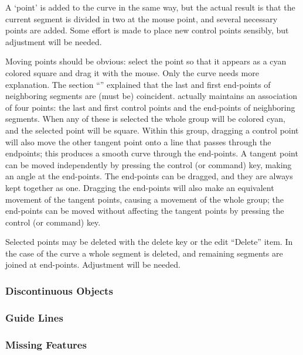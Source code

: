 			A `point' is added to the \IXbezn{} curve in the
			same way, but the actual result is that the current
			segment is divided in two at the mouse point, and
			several necessary points are added. Some effort is
			made to place new  control
			points sensibly, but adjustment will be needed.
			
			Moving points should be obvious: select the point so
			that it appears as a cyan colored square and drag it
			with the mouse. Only the \IXbezn{} curve needs more
			explanation. The section
			``'' explained
			that the last and first end-points of neighboring
			segments are (must be) coincident. \IXpkgu{}
			actually maintains an association of four points:
			the last and first  control points
			and the end-points of neighboring segments. When any
			of these is selected the whole group will be
			colored cyan, and the selected point will be square.
			Within this group, dragging a 
			control point will also move the other tangent
			point onto a line that passes through the endpoints;
			this produces a smooth curve through the end-points.
			A tangent point can be moved independently by
			pressing the control (or command) key, making
			an angle at the end-points. The end-points can
			be dragged, and they are always kept together
			as one. Dragging the end-points will also make
			an equivalent movement of the
			tangent points, causing a movement of the
			whole group; the end-points can be moved
			without affecting the tangent points by
			pressing the control (or command) key.
			
			Selected points may be deleted with the delete key
			or the edit  ``Delete'' item.
			In the case of the
			\IXbezn{} curve a whole segment is
			deleted, and remaining segments are joined at
			end-points. Adjustment will be needed.

			\subsubsection{Discontinuous Objects}%
			\label{sssec:discont_objects}

			\subsubsection{Guide Lines}%
			\label{sssec:guide_lines}

			\subsubsection{Missing Features}%
			\label{sssec:missing_todo}


